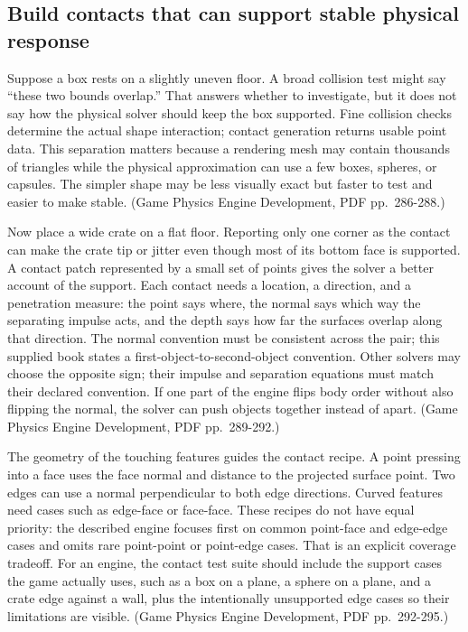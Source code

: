 \subsection{Build contacts that can support stable physical response}\label{06-engine-ii-ch033-build-contacts-that-can-support-stable-physical-response}

Suppose a box rests on a slightly uneven floor. A broad collision test might say ``these two bounds overlap.'' That answers whether to investigate, but it does not say how the physical solver should keep the box supported. Fine collision checks determine the actual shape interaction; contact generation returns usable point data. This separation matters because a rendering mesh may contain thousands of triangles while the physical approximation can use a few boxes, spheres, or capsules. The simpler shape may be less visually exact but faster to test and easier to make stable. (Game Physics Engine Development, PDF pp.~286-288.)

Now place a wide crate on a flat floor. Reporting only one corner as the contact can make the crate tip or jitter even though most of its bottom face is supported. A contact patch represented by a small set of points gives the solver a better account of the support. Each contact needs a location, a direction, and a penetration measure: the point says where, the normal says which way the separating impulse acts, and the depth says how far the surfaces overlap along that direction. The normal convention must be consistent across the pair; this supplied book states a first-object-to-second-object convention. Other solvers may choose the opposite sign; their impulse and separation equations must match their declared convention. If one part of the engine flips body order without also flipping the normal, the solver can push objects together instead of apart. (Game Physics Engine Development, PDF pp.~289-292.)

The geometry of the touching features guides the contact recipe. A point pressing into a face uses the face normal and distance to the projected surface point. Two edges can use a normal perpendicular to both edge directions. Curved features need cases such as edge-face or face-face. These recipes do not have equal priority: the described engine focuses first on common point-face and edge-edge cases and omits rare point-point or point-edge cases. That is an explicit coverage tradeoff. For an engine, the contact test suite should include the support cases the game actually uses, such as a box on a plane, a sphere on a plane, and a crate edge against a wall, plus the intentionally unsupported edge cases so their limitations are visible. (Game Physics Engine Development, PDF pp.~292-295.)

